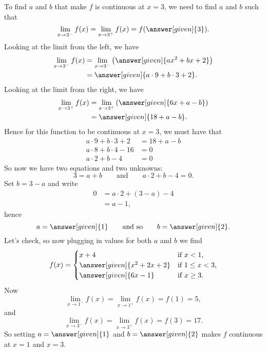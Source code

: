 \documentclass{ximera}
\begin{document}
\begin{example}
\begin{explanation}
To find $a$ and $b$ that make $f$ is continuous at $x=3$, we need to
find $a$ and $b$ such that
\[
\lim_{x\to 3^-} f(x) =\lim_{x\to 3^+}f(x) =f(\answer[given]{3}).
\]
Looking at the limit from the left, we have
\begin{align*}
  \lim_{x\to 3^-} f(x) &= \lim_{x\to 3^-} \left(\answer[given]{ax^2+bx+2}\right) \\
  &=\answer[given]{a\cdot 9 + b\cdot 3 + 2}.
\end{align*}
Looking at the limit from the right, we have
\begin{align*}
  \lim_{x\to 3^+} f(x) &= \lim_{x\to 3^+} \left(\answer[given]{6x+a-b}\right) \\
  &= \answer[given]{18+a-b}.
\end{align*}
Hence for this function to be continuous at $x=3$, we must have that
\begin{align*}
  a\cdot 9 + b\cdot 3 + 2 &= 18+a-b\\
  a\cdot 8 + b\cdot 4 -16 &= 0\\
  a\cdot 2 + b -4 &= 0
\end{align*}
So now we have two equations and two unknowns:
\[
 3=a+b \qquad\text{and}\qquad a\cdot 2 + b -4 = 0.
 \]
 Set $b = 3-a$ and write
 \begin{align*}
   0&= a\cdot 2 + (3-a) -4 \\
   &= a -1,
 \end{align*}
 hence
 \[
 a=\answer[given]{1}\qquad\text{and so}\qquad b =\answer[given]{2}.
 \]
 Let's check, so now plugging in values for both $a$ and $b$ we find
 \[
 f(x) = 
 \begin{cases}
   x+4 &\text{if $x<1$,}\\
   \answer[given]{x^2+2x+2} &\text{if $1\le x< 3$,}\\
   \answer[given]{6x-1} &\text{if $x\ge 3$.}
\end{cases}
 \]
 Now
 \[
 \lim_{x\to 1^-} f(x) =\lim_{x\to 1^+}f(x) =f(1) =  5,
 \]
 and
 \[
 \lim_{x\to 3^-} f(x) =\lim_{x\to 3^+}f(x) =f(3) = 17.  
 \]
 So setting $a= \answer[given]{1}$ and $b=\answer[given]{2}$ makes $f$ continuous at $x=1$ and $x=3$.
\end{explanation}
\end{example}
\end{document}
